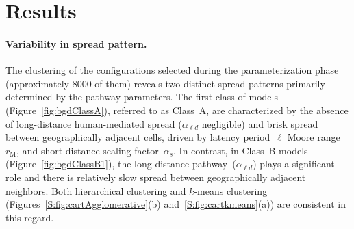 \documentclass[11pt]{article}
\newcommand{\asd}{\alpha_s}
\newcommand{\ald}{\alpha_{\ell d}}
\newcommand{\mooreRange}{r_\mathrm{M}}
\theoremstyle{definition}
\begin{document}
\section{Results}
\paragraph{Variability in spread pattern.} The clustering of the
configurations selected during the parameterization phase (approximately
8000 of them) reveals two distinct spread patterns primarily determined by
the pathway parameters.  The first class of models
(Figure~\ref{fig:bgdClassA}), referred to as Class~A, are characterized by
the absence of long-distance human-mediated spread ($\ald$ negligible) and
brisk spread between geographically adjacent cells, driven by latency
period~$\ell$ Moore range~$\mooreRange$, and short-distance scaling
factor~$\asd$. In contrast, in Class~B models
(Figure~\ref{fig:bgdClassB1}), the long-distance pathway~($\ald$) plays a
significant role  and there is relatively slow spread between
geographically adjacent neighbors. Both hierarchical clustering and
$k$-means clustering (Figures~\ref{S:fig:cartAgglomerative}(b)
and~\ref{S:fig:cartkmeans}(a)) are consistent in this regard.
\end{document}
